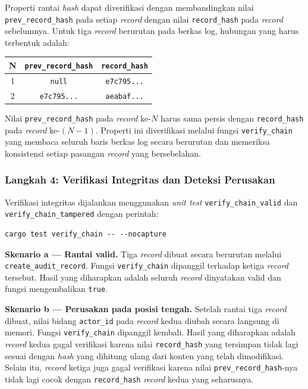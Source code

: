 Properti rantai \textit{hash} dapat diverifikasi dengan membandingkan nilai
\texttt{prev\_record\_hash} pada setiap \textit{record} dengan nilai
\texttt{record\_hash} pada \textit{record} sebelumnya. Untuk tiga \textit{record}
berurutan pada berkas log, hubungan yang harus terbentuk adalah:
 
\begin{center}
\begin{tabular}{|c|c|c|}
\hline
\textbf{N} & \textbf{\texttt{prev\_record\_hash}} & \textbf{\texttt{record\_hash}} \\
\hline
1 & \texttt{null} & \texttt{e7c795...} \\
\hline
2 & \texttt{e7c795...} & \texttt{aeabaf...} \\
\hline
\hline
\end{tabular}
\end{center}
 
Nilai \texttt{prev\_record\_hash} pada \textit{record} ke-$N$ harus sama persis
dengan \texttt{record\_hash} pada \textit{record} ke-$(N-1)$. Properti ini
diverifikasi melalui fungsi \texttt{verify\_chain} yang membaca seluruh baris
berkas log secara berurutan dan memeriksa konsistensi setiap pasangan
\textit{record} yang bersebelahan.
 
\subsubsection{Langkah 4: Verifikasi Integritas dan Deteksi Perusakan}
 
Verifikasi integritas dijalankan menggunakan \textit{unit test} \texttt{verify\_chain\_valid}
dan \texttt{verify\_chain\_tampered} dengan perintah:
 
\begin{verbatim}
cargo test verify_chain -- --nocapture
\end{verbatim}
 
\textbf{Skenario a --- Rantai valid.} Tiga \textit{record} dibuat secara
berurutan melalui \texttt{create\_audit\_record}. Fungsi \texttt{verify\_chain}
dipanggil terhadap ketiga \textit{record} tersebut. Hasil yang diharapkan adalah
seluruh \textit{record} dinyatakan valid dan fungsi mengembalikan \texttt{true}.
 
\textbf{Skenario b --- Perusakan pada posisi tengah.} Setelah rantai tiga
\textit{record} dibuat, nilai bidang \texttt{actor\_id} pada \textit{record}
kedua diubah secara langsung di memori. Fungsi \texttt{verify\_chain} dipanggil
kembali. Hasil yang diharapkan adalah \textit{record} kedua gagal verifikasi
karena nilai \texttt{record\_hash} yang tersimpan tidak lagi sesuai dengan
\textit{hash} yang dihitung ulang dari konten yang telah dimodifikasi. Selain
itu, \textit{record} ketiga juga gagal verifikasi karena nilai
\texttt{prev\_record\_hash}-nya tidak lagi cocok dengan \texttt{record\_hash}
\textit{record} kedua yang seharusnya.
 
